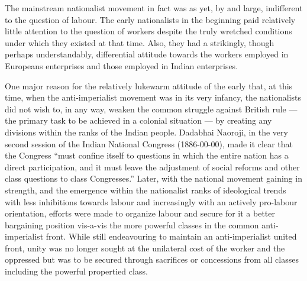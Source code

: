 \begin{multicols}{2}
The mainstream nationalist movement in fact was as yet, by and large, indifferent to the question of labour. The early nationalists in the beginning paid relatively little attention to the question of workers despite the truly wretched conditions under which they existed at that time. Also, they had a strikingly, though perhaps understandably, differential attitude towards the workers employed in Europeans enterprises and those employed in Indian enterprises.

One major reason for the relatively lukewarm attitude of the early that, at this time, when the anti-imperialist movement was in its very infancy, the nationalists did not wish to, in any way, weaken the common struggle against British rule --- the primary task to be achieved in a colonial situation --- by creating any divisions within the ranks of the Indian people. Dadabhai Naoroji, in the very second session of the Indian National Congress (1886-00-00), made it clear that the Congress ``must confine itself to questions in which the entire nation has a direct participation, and it must leave the adjustment of social reforms and other class questions to class Congresses.'' Later, with the national movement gaining in strength, and the emergence within the nationalist ranks of ideological trends with less inhibitions towards labour and increasingly with an actively pro-labour orientation, efforts were made to organize labour and secure for it a better bargaining position vis-a-vis the more powerful classes in the common anti-imperialist front. While still endeavouring to maintain an anti-imperialist united front, unity was no longer sought at the unilateral cost of the worker and the oppressed but was to be secured through sacrifices or concessions from all classes including the powerful propertied class.


\end{multicols}
